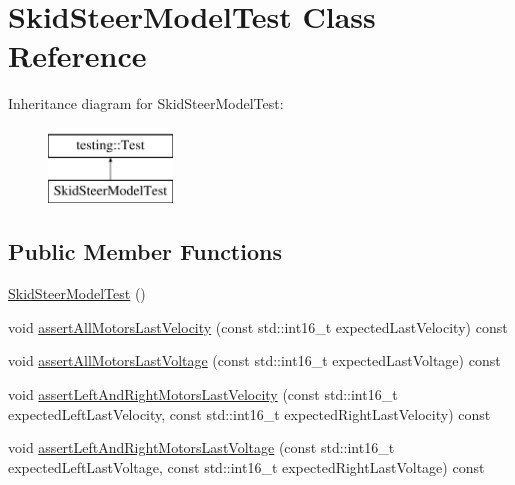 \hypertarget{classSkidSteerModelTest}{}\section{Skid\+Steer\+Model\+Test Class Reference}
\label{classSkidSteerModelTest}
Inheritance diagram for Skid\+Steer\+Model\+Test\+:\begin{figure}[H]
\begin{center}
\leavevmode
\includegraphics[height=2.000000cm]{classSkidSteerModelTest}
\end{center}
\end{figure}
\subsection*{Public Member Functions}
\begin{DoxyCompactItemize}
\item 
\mbox{\hyperlink{classSkidSteerModelTest_a9982df40a91b78d26e4d09bb56ec8d84}{Skid\+Steer\+Model\+Test}} ()
\item 
void \mbox{\hyperlink{classSkidSteerModelTest_a6a2b81c0cfe2456e5fc0039f1a42f355}{assert\+All\+Motors\+Last\+Velocity}} (const std\+::int16\+\_\+t expected\+Last\+Velocity) const
\item 
void \mbox{\hyperlink{classSkidSteerModelTest_a431e1485c6702974be47a0d5e542668f}{assert\+All\+Motors\+Last\+Voltage}} (const std\+::int16\+\_\+t expected\+Last\+Voltage) const
\item 
void \mbox{\hyperlink{classSkidSteerModelTest_a4308c44744332a69a1759415b38fca06}{assert\+Left\+And\+Right\+Motors\+Last\+Velocity}} (const std\+::int16\+\_\+t expected\+Left\+Last\+Velocity, const std\+::int16\+\_\+t expected\+Right\+Last\+Velocity) const
\item 
void \mbox{\hyperlink{classSkidSteerModelTest_a977356f6e434d76aa0b17e9be1337d10}{assert\+Left\+And\+Right\+Motors\+Last\+Voltage}} (const std\+::int16\+\_\+t expected\+Left\+Last\+Voltage, const std\+::int16\+\_\+t expected\+Right\+Last\+Voltage) const
\end{DoxyCompactItemize}
